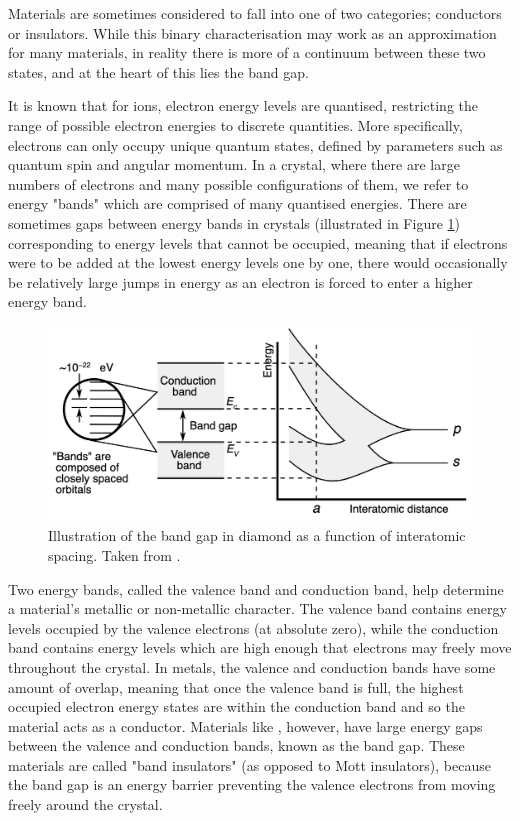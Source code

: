 Materials are sometimes considered to fall into one of two categories; conductors or insulators. While this binary characterisation may work as an approximation for many materials, in reality there is more of a continuum between these two states, and at the heart of this lies the band gap.

It is known that for ions, electron energy levels are quantised, restricting the range of possible electron energies to discrete quantities. More specifically, electrons can only occupy unique quantum states, defined by parameters such as quantum spin and angular momentum. In a crystal, where there are large numbers of electrons and many possible configurations of them, we refer to energy "bands" which are comprised of many quantised energies. There are sometimes gaps between energy bands in crystals (illustrated in Figure \ref{figure:band_gap}) corresponding to energy levels that cannot be occupied, meaning that if electrons were to be added at the lowest energy levels one by one, there would occasionally be relatively large jumps in energy as an electron is forced to enter a higher energy band. 

\begin{figure}[htp]
\centering
\includegraphics[width=\linewidth]{images/band_gap.png}
\caption[Illustration of the band gap in diamond as a function of interatomic spacing.]{Illustration of the band gap in diamond as a function of interatomic spacing. Taken from \cite{Chetvorno2017}.}
\label{figure:band_gap}
\end{figure}

Two energy bands, called the valence band and conduction band, help determine a material's metallic or non-metallic character. The valence band contains energy levels occupied by the valence electrons (at absolute zero), while the conduction band contains energy levels which are high enough that electrons may freely move throughout the crystal. In metals, the valence and conduction bands have some amount of overlap, meaning that once the valence band is full, the highest occupied electron energy states are within the conduction band and so the material acts as a conductor. Materials like \zirconia , however, have large energy gaps between the valence and conduction bands, known as the band gap. These materials are called "band insulators" (as opposed to Mott insulators), because the band gap is an energy barrier preventing the valence electrons from moving freely around the crystal.

